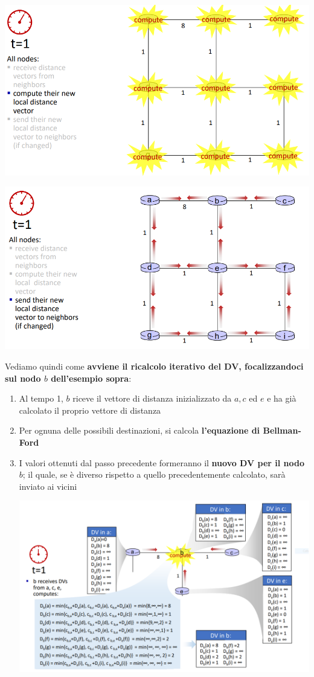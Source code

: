 \documentclass[12pt]{article}
\begin{document}
\begin{enumerate}
\begin{center}
        \includegraphics[width =0.90\linewidth]{Images/103.png}
    \end{center}
    \begin{center}
        \includegraphics[width =0.90\linewidth]{Images/104.png}
    \end{center}
\end{enumerate}
Vediamo quindi come \textbf{avviene il ricalcolo iterativo del DV, focalizzandoci sul nodo $b$ dell'esempio sopra}:
\begin{enumerate}
    \item Al tempo 1, $b$ riceve il vettore di distanza inizializzato da $a, c$ ed $e$ e ha già calcolato il proprio vettore di distanza
    \item Per ognuna delle possibili destinazioni, si calcola \textbf{l'equazione di Bellman-Ford}
    \item I valori ottenuti dal passo precedente formeranno il \textbf{nuovo DV per il nodo $b$}; il quale, se è diverso rispetto a quello precedentemente calcolato, sarà inviato ai vicini
    \begin{center}
        \includegraphics[width =1\linewidth]{Images/105.png}
    \end{center}
\end{enumerate}
\end{document}
